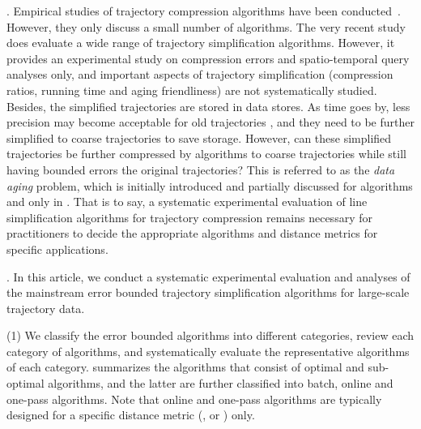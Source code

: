 {. Empirical studies of trajectory compression algorithms have been conducted~\cite{Muckell:Compression,MuckellHLR10,mThesis}. However, they only discuss a small number of algorithms. The very recent study \cite{Zhang:Evaluation} does evaluate a wide range of trajectory simplification algorithms.
However, it provides {an experimental study} on compression errors and spatio-temporal query analyses only, and important aspects of trajectory simplification (compression ratios, running time and aging friendliness) are not systematically studied. Besides, the simplified trajectories are stored in data stores. As time goes by, less precision may become acceptable for old trajectories \cite{Cao:Spatio}, and they need to be further simplified to coarse trajectories to save storage. However, can these simplified trajectories be further compressed by \lsa algorithms to coarse trajectories while still having bounded errors \wrt the original trajectories? This is referred to as the \emph{data aging} problem, which is initially introduced and partially discussed for algorithms \opt and \dpa only in \cite{Cao:Spatio}.
That is to say, a systematic experimental evaluation of line simplification algorithms for trajectory compression remains necessary for practitioners to decide the appropriate algorithms and distance metrics for specific applications.





.
In this article, we conduct a systematic experimental evaluation and analyses of the mainstream error bounded trajectory simplification algorithms for large-scale trajectory data.

\stab (1) We classify the error bounded \lsa algorithms into different categories, review each category of algorithms, and systematically evaluate the representative algorithms of each category.
%
 summarizes the algorithms that consist of optimal and sub-optimal algorithms, and the latter are further classified into batch, online and one-pass algorithms.
Note that online and one-pass algorithms are typically designed for a specific distance metric  (\ped, \sed or \dad) only.

}
